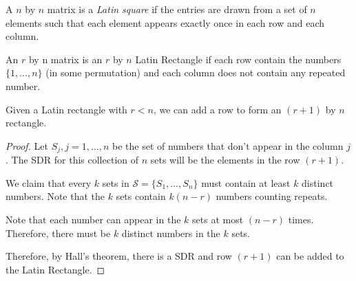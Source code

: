 \begin{definition}
A $n$ by $n$ matrix is a \emph{Latin square} if the entries are drawn from a set of $n$ elements such that each element appears exactly once in each row and each column.
\end{definition}
\begin{definition}
An $r$ by n matrix is an $r$ by $n$ Latin Rectangle if each row contain the numbers $\{1,\dots,n\}$ (in some permutation) and each column does not contain any repeated number.
\end{definition}
\begin{theorem}
Given a Latin rectangle with $r<n$, we can add a row to form an $(r+1)$ by $n$ rectangle.
\end{theorem}

\begin{proof}
Let $S_j, j=1,\dots,n$ be the set of numbers that don't appear in the column $j$.
The SDR for this collection of $n$ sets will be the elements in the row $(r+1)$.

We claim that every $k$ sets in $\mathcal{S}=\{S_1,\dots,S_n\}$ must contain at least $k$ distinct numbers.
Note that the $k$ sets contain $k(n-r)$ numbers counting repeats.

Note that each number can appear in the $k$ sets at most $(n-r)$ times.
Therefore, there must be $k$ distinct numbers in the $k$ sets.

Therefore, by Hall's theorem, there is a SDR and row $(r+1)$ can be added to the Latin Rectangle.
\end{proof}


